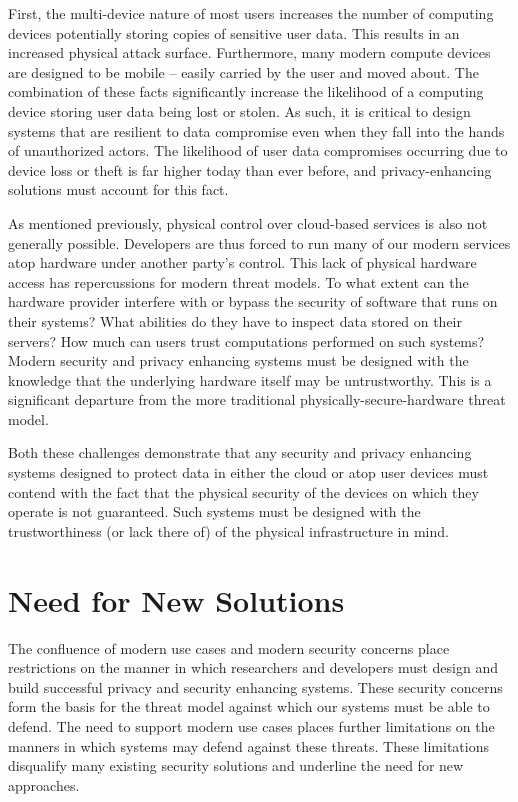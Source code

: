 First, the multi-device nature of most users increases the number of
computing devices potentially storing copies of sensitive user
data. This results in an increased physical attack surface.
Furthermore, many modern compute devices are designed to be mobile --
easily carried by the user and moved about. The combination of these
facts significantly increase the likelihood of a computing device
storing user data being lost or stolen. As such, it is critical to
design systems that are resilient to data compromise even when they
fall into the hands of unauthorized actors. The likelihood of user
data compromises occurring due to device loss or theft is far higher
today than ever before, and privacy-enhancing solutions must account
for this fact.

As mentioned previously, physical control over cloud-based services is
also not generally possible. Developers are thus forced to run many of
our modern services atop hardware under another party's control. This
lack of physical hardware access has repercussions for modern threat
models. To what extent can the hardware provider interfere with or
bypass the security of software that runs on their systems? What
abilities do they have to inspect data stored on their servers? How
much can users trust computations performed on such systems?  Modern
security and privacy enhancing systems must be designed with the
knowledge that the underlying hardware itself may be
untrustworthy. This is a significant departure from the more
traditional physically-secure-hardware threat model.

Both these challenges demonstrate that any security and privacy
enhancing systems designed to protect data in either the cloud or atop
user devices must contend with the fact that the physical security of
the devices on which they operate is not guaranteed. Such systems must
be designed with the trustworthiness (or lack there of) of the
physical infrastructure in mind.

\section{Need for New Solutions}
\label{chap:challenges:solutions}

The confluence of modern use cases and modern security concerns place
restrictions on the manner in which researchers and developers must
design and build successful privacy and security enhancing
systems. These security concerns form the basis for the threat model
against which our systems must be able to defend. The need to support
modern use cases places further limitations on the manners in which
systems may defend against these threats. These limitations disqualify
many existing security solutions and underline the need for new
approaches.

